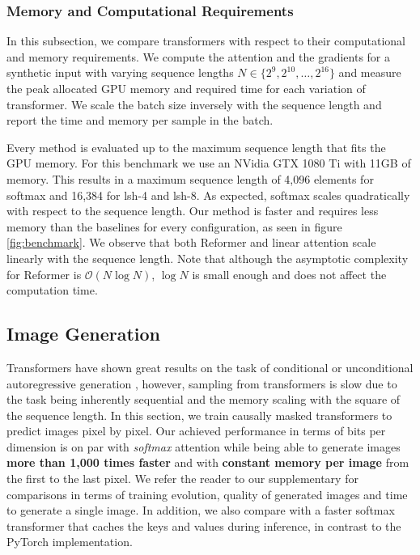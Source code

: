 \subsubsection{Memory and Computational Requirements}

In this subsection, we compare transformers with respect to their computational and memory requirements. We compute the attention and the gradients for a synthetic input with varying sequence lengths $N \in \{2^9, 2^{10}, \dots,
2^{16}\}$ and measure the peak allocated GPU memory and required time for each variation of transformer. We scale the batch size inversely with the sequence length and report the time and memory per sample in the batch.

Every method is evaluated up to the maximum sequence length that fits the GPU memory. For this benchmark we use an NVidia GTX 1080 Ti with 11GB of memory. This results in a maximum sequence length of 4,096 elements for softmax and 16,384 for lsh-4 and lsh-8. As expected, softmax scales quadratically with respect to the sequence length.  Our method is faster and requires less memory than the baselines for every configuration, as seen in figure
\ref{fig:benchmark}.  We observe that both Reformer and linear attention scale linearly with the sequence length. Note that although the asymptotic complexity for Reformer is $\mathcal{O}\left(N \log N\right)$, $\log N$ is small enough and does not affect the computation time.

\subsection{Image Generation} \label{sec:image}

Transformers have shown great results on the task of conditional or unconditional autoregressive generation \cite{radford2019language, child2019generating}, however, sampling from transformers is slow due to the task being inherently sequential and the memory scaling with the square of the sequence length. In this section, we train causally masked transformers to predict images pixel by pixel. Our achieved performance in terms of bits per dimension is on par with \emph{softmax} attention while being able to generate images \textbf{more than 1,000 times faster} and with \textbf{constant memory per image} from the first to the last pixel. We refer the reader to our supplementary for comparisons in terms of training evolution, quality of generated images and time to generate a single image. In addition, we also compare with a faster softmax transformer that caches the keys and values during inference, in contrast to the PyTorch implementation.

